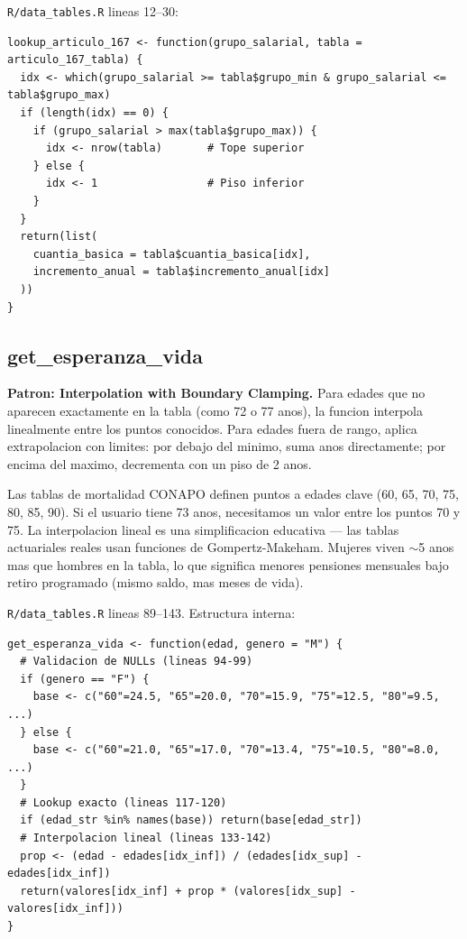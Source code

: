 \documentclass[11pt, letterpaper, twoside]{report}
\begin{document}
\begin{codigobox}
\texttt{R/data\_tables.R} lineas 12--30:
\begin{lstlisting}[caption={lookup\_articulo\_167}]
lookup_articulo_167 <- function(grupo_salarial, tabla = articulo_167_tabla) {
  idx <- which(grupo_salarial >= tabla$grupo_min & grupo_salarial <= tabla$grupo_max)
  if (length(idx) == 0) {
    if (grupo_salarial > max(tabla$grupo_max)) {
      idx <- nrow(tabla)       # Tope superior
    } else {
      idx <- 1                 # Piso inferior
    }
  }
  return(list(
    cuantia_basica = tabla$cuantia_basica[idx],
    incremento_anual = tabla$incremento_anual[idx]
  ))
}
\end{lstlisting}
\end{codigobox}


\subsection{get\_esperanza\_vida}

\begin{patronbox}
\textbf{Patron: Interpolation with Boundary Clamping.} Para edades que no
aparecen exactamente en la tabla (como 72 o 77 anos), la funcion interpola
linealmente entre los puntos conocidos. Para edades fuera de rango, aplica
extrapolacion con limites: por debajo del minimo, suma anos directamente;
por encima del maximo, decrementa con un piso de 2 anos.
\end{patronbox}

\begin{intuicionbox}
Las tablas de mortalidad CONAPO definen puntos a edades clave (60, 65, 70, 75, 80,
85, 90). Si el usuario tiene 73 anos, necesitamos un valor entre los puntos
70 y 75. La interpolacion lineal es una simplificacion educativa --- las tablas
actuariales reales usan funciones de Gompertz-Makeham.
Mujeres viven $\sim$5 anos mas que hombres en la tabla, lo que significa menores
pensiones mensuales bajo retiro programado (mismo saldo, mas meses de vida).
\end{intuicionbox}

\begin{codigobox}
\texttt{R/data\_tables.R} lineas 89--143. Estructura interna:
\begin{lstlisting}[caption={Tablas de mortalidad con interpolacion}]
get_esperanza_vida <- function(edad, genero = "M") {
  # Validacion de NULLs (lineas 94-99)
  if (genero == "F") {
    base <- c("60"=24.5, "65"=20.0, "70"=15.9, "75"=12.5, "80"=9.5, ...)
  } else {
    base <- c("60"=21.0, "65"=17.0, "70"=13.4, "75"=10.5, "80"=8.0, ...)
  }
  # Lookup exacto (lineas 117-120)
  if (edad_str %in% names(base)) return(base[edad_str])
  # Interpolacion lineal (lineas 133-142)
  prop <- (edad - edades[idx_inf]) / (edades[idx_sup] - edades[idx_inf])
  return(valores[idx_inf] + prop * (valores[idx_sup] - valores[idx_inf]))
}
\end{lstlisting}
\end{codigobox}
\end{document}
